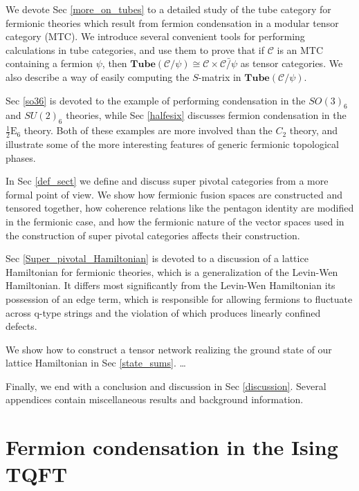 \documentclass[12pt,a4paper]{article}
\newcommand{\mcc}{\mathcal{C}}
\newcommand{\tube}{\textbf{Tube}}
\newcommand{\halfesix}{\frac{1}{2}\text{E}_6}
\begin{document}
We devote Sec \ref{more_on_tubes} to a detailed study of the tube category 
for fermionic theories which result from fermion condensation in a modular tensor category (MTC). 
We introduce several convenient tools for performing calculations in tube categories, 
and use them to prove that if $\mcc$ is an MTC containing a fermion $\psi$, then
$\tube(\mcc/\psi)\cong \mcc\times \bar{\mcc/\psi}$ as tensor 
categories. We also describe a way of easily computing the $S$-matrix in 
$\tube(\mcc/\psi)$. 

Sec \ref{so36} is devoted to the example of performing condensation in the $SO(3)_6$ 
and $SU(2)_6$ theories, while Sec \ref{halfesix} discusses fermion condensation in the $
\halfesix$ theory. 
Both of these examples are more involved than the $C_2$ theory, 
and illustrate some of the more interesting features of generic fermionic topological phases. 

In Sec \ref{def_sect} we define and discuss super pivotal categories from a more formal point of view. 
We show how fermionic fusion spaces are constructed and tensored together, how 
coherence relations like the pentagon identity are modified in the fermionic case, 
and how the fermionic nature of the vector spaces used in the construction of super 
pivotal categories affects their construction. 

Sec \ref{Super_pivotal_Hamiltonian} is devoted to a discussion of a lattice Hamiltonian for fermionic theories, which is a generalization of the Levin-Wen Hamiltonian. 
It differs most significantly from the Levin-Wen Hamiltonian its possession of an edge term, which 
is responsible for allowing fermions to fluctuate across q-type strings and the violation 
of which produces linearly confined defects. 

We show how to construct a tensor network realizing the ground state of our lattice Hamiltonian 
in Sec \ref{state_sums}. \dots


Finally, we end with a conclusion and discussion in Sec \ref{discussion}. 
Several appendices contain miscellaneous results and background information. 



\section{Fermion condensation in the Ising TQFT}  \label{C2_condense_sect}
\end{document}
